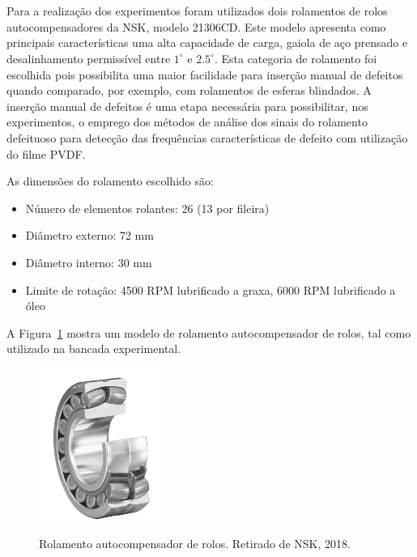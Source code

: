 \documentclass[
	12pt,				
	oneside,			
	a4paper,			
	english,			
	brazil,			
	]{abntex2ppgsi}
\begin{document}
\section{}

Para a realização dos experimentos foram utilizados dois rolamentos de rolos autocompensadores da NSK, modelo 21306CD. Este modelo apresenta como principais características uma alta capacidade de carga, gaiola de aço prensado e desalinhamento permissível entre $1^{\circ}$ e $2.5^{\circ}$. Esta categoria de rolamento foi escolhida pois possibilita uma maior facilidade para inserção manual de defeitos quando comparado, por exemplo, com rolamentos de esferas blindados. A inserção manual de defeitos é uma etapa necessária para possibilitar, nos experimentos, o emprego dos métodos de análise dos sinais do rolamento defeituoso para detecção das frequências características de defeito com utilização do filme PVDF. 

As dimensões do rolamento escolhido são:

\begin{itemize}
	\item Número de elementos rolantes: 26 (13 por fileira)
	\item Diâmetro externo: 72 \si{\mm}
	\item Diâmetro interno: 30 \si{\mm}
	\item Limite de rotação: 4500 RPM lubrificado a graxa, 6000 RPM lubrificado a óleo
\end{itemize}

A Figura~\ref{Figura24} mostra um modelo de rolamento autocompensador de rolos, tal como utilizado na bancada experimental.

\begin{figure}[H]
\centering
\caption {Rolamento autocompensador de rolos. Retirado de NSK, 2018.}
\includegraphics[width=\textwidth,height=50mm,keepaspectratio]{Figura24}
\label{Figura24}
\end{figure} 
\end{document}
